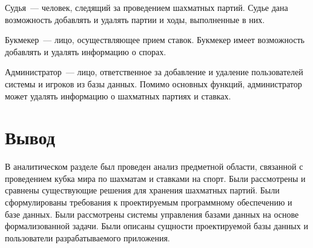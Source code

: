 Судья~--- человек, следящий за проведением шахматных партий. Судье дана возможность добавлять и удалять партии и ходы, выполненные в них.

Букмекер~--- лицо, осуществляющее прием ставок. Букмекер имеет возможность добавлять и удалять информацию о спорах.

Администратор~--- лицо, ответственное за добавление и удаление пользователей системы и игроков из базы данных. Помимо основных функций, администратор может удалять информацию о шахматных партиях и ставках.

\section*{Вывод}

В аналитическом разделе был проведен анализ предметной области, связанной с проведением кубка мира по шахматам и ставками на спорт. Были рассмотрены и сравнены существующие решения для хранения шахматных партий. Были сформулированы требования к проектируемым программному обеспечению и базе данных. Были рассмотрены системы управления базами данных на основе формализованной задачи. Были описаны сущности проектируемой базы данных и пользователи разрабатываемого приложения.

\clearpage
